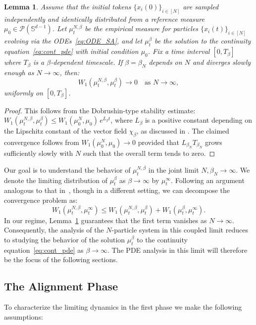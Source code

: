 \documentclass{article}
\numberwithin{theorem}{section}
\newtheorem{lemma}[theorem]{Lemma}
\begin{document}
\begin{lemma}
\label{lem:dobrushin}
    Assume that the initial tokens $\{x_i(0)\}_{i\in [N]}$ are sampled independently and identically distributed from a reference measure $\mu_0 \in \mathcal{P}(\mathbb{S}^{d-1})$. Let $\mu^{N,\beta}_t$ be the empirical measure for particles $\{x_i(t)\}_{i\in[N]}$ evolving via the ODEs~\eqref{eq:ODE_SA}, and let $\mu^\beta_t$ be the solution to the continuity equation~\eqref{eq:cont_pde} with initial condition $\mu_0$. Fix a time interval $[0,T_\beta]$ where $T_\beta$ is a $\beta$-dependent timescale. If $\beta = \beta_N$ depends on $N$ and diverges slowly enough as $N \to \infty$, then:
    $$ W_1(\mu^{N,\beta}_t, \mu^{\beta}_t)\to 0 \quad \text{as } N \to \infty, $$
    uniformly on $[0,T_\beta]$.
\end{lemma}
\begin{proof}
This follows from the Dobrushin-type stability estimate:
$ W_1(\mu^{N,\beta}_t, \mu^\beta_t) \leq W_1(\mu^N_0, \mu_0)\, e^{L_\beta t}$,
where $L_\beta$ is a positive constant depending on the Lipschitz constant of the vector field $\chi_\beta$, as discussed in \cite{bruno2024emergence}. The claimed convergence follows from $W_1(\mu^N_0, \mu_0) \to 0$ provided that $L_{\beta_N}T_{\beta_N}$ grows sufficiently slowly with $N$ such that the overall term tends to zero.
\end{proof}
Our goal is to understand the behavior of $\mu_t^{N,\beta}$ in the joint limit $N, \beta_N \to \infty$. We denote the limiting distribution of $\mu_t^\beta$ as $\beta \to \infty$ by $\mu_t^\infty$. Following an argument analogous to that in~\cite{figalli2008convergence}, though in a different setting, we can decompose the convergence problem as:
$$W_1(\mu_t^{N,\beta}, \mu^\infty_t) \leq W_1(\mu_t^{N,\beta}, \mu^\beta_t) + W_1(\mu_t^\beta, \mu^\infty_t).$$
In our regime, Lemma~\ref{lem:dobrushin} guarantees that the first term vanishes as $N \to \infty$. Consequently, the analysis of the $N$-particle system in this coupled limit reduces to studying the behavior of the solution $\mu_t^\beta$ to the continuity equation~\eqref{eq:cont_pde} as $\beta \to \infty$. The PDE analysis in this limit will therefore be the focus of the following sections.

\subsection{The Alignment Phase}\label{sec:align}

To characterize the limiting dynamics in the first phase we make the following assumptions:
\end{document}
